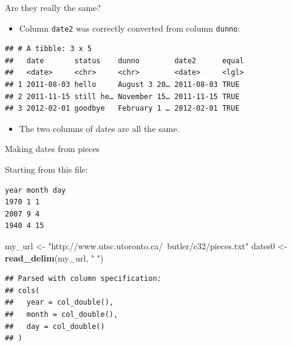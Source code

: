 \documentclass[ignorenonframetext,]{beamer}
\newenvironment{Shaded}{\begin{snugshade}}{\end{snugshade}}
\newcommand{\DataTypeTok}[1]{\textcolor[rgb]{0.13,0.29,0.53}{#1}}
\newcommand{\KeywordTok}[1]{\textcolor[rgb]{0.13,0.29,0.53}{\textbf{#1}}}
\newcommand{\NormalTok}[1]{#1}
\newcommand{\OperatorTok}[1]{\textcolor[rgb]{0.81,0.36,0.00}{\textbf{#1}}}
\newcommand{\StringTok}[1]{\textcolor[rgb]{0.31,0.60,0.02}{#1}}
\providecommand{\tightlist}{%
  \setlength{\itemsep}{0pt}\setlength{\parskip}{0pt}}
\begin{document}
\begin{frame}[fragile]{Are they really the same?}
\protect\hypertarget{are-they-really-the-same}{}

\begin{itemize}
\tightlist
\item
  Column \texttt{date2} was correctly converted from column
  \texttt{dunno}:
\end{itemize}

\begin{Shaded}
\end{Shaded}

\begin{verbatim}
## # A tibble: 3 x 5
##   date       status    dunno        date2      equal
##   <date>     <chr>     <chr>        <date>     <lgl>
## 1 2011-08-03 hello     August 3 20… 2011-08-03 TRUE 
## 2 2011-11-15 still he… November 15… 2011-11-15 TRUE 
## 3 2012-02-01 goodbye   February 1 … 2012-02-01 TRUE
\end{verbatim}

\begin{itemize}
\tightlist
\item
  The two columns of dates are all the same.
\end{itemize}

\end{frame}

\begin{frame}[fragile]{Making dates from pieces}
\protect\hypertarget{making-dates-from-pieces}{}

Starting from this file:

\begin{verbatim}
year month day
1970 1 1
2007 9 4
1940 4 15
\end{verbatim}

\begin{Shaded}
\begin{Highlighting}[]
\NormalTok{my_url <-}\StringTok{ "http://www.utsc.utoronto.ca/~butler/c32/pieces.txt"}
\NormalTok{dates0 <-}\StringTok{ }\KeywordTok{read_delim}\NormalTok{(my_url, }\StringTok{" "}\NormalTok{)}
\end{Highlighting}
\end{Shaded}

\begin{verbatim}
## Parsed with column specification:
## cols(
##   year = col_double(),
##   month = col_double(),
##   day = col_double()
## )
\end{verbatim}

\end{frame}
\end{document}
